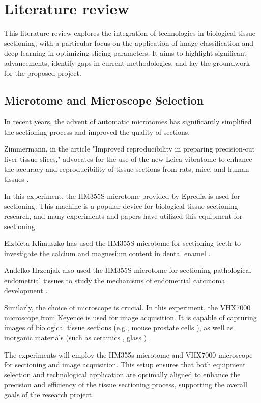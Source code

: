 \section{Literature review}

This literature review explores the integration of technologies in biological tissue sectioning, with a particular focus on the application of image classification and deep learning in optimizing slicing parameters. It aims to highlight significant advancements, identify gaps in current methodologies, and lay the groundwork for the proposed project.

\subsection{Microtome and Microscope Selection}

In recent years, the advent of automatic microtomes has significantly simplified the sectioning process and improved the quality of sections.

Zimmermann, in the article "Improved reproducibility in preparing precision-cut liver tissue slices," advocates for the use of the new Leica vibratome to enhance the accuracy and reproducibility of tissue sections from rats, mice, and human tissues \cite{LR.1}.

In this experiment, the HM355S microtome provided by Epredia is used for sectioning. This machine is a popular device for biological tissue sectioning research, and many experiments and papers have utilized this equipment for sectioning.

Elzbieta Klimuszko has used the HM355S microtome for sectioning teeth to investigate the calcium and magnesium content in dental enamel \cite{LR.2}.

Andelko Hrzenjak also used the HM355S microtome for sectioning pathological endometrial tissues to study the mechanisms of endometrial carcinoma development \cite{LR.3}.

Similarly, the choice of microscope is crucial. In this experiment, the VHX7000 microscope from Keyence is used for image acquisition. It is capable of capturing images of biological tissue sections (e.g., mouse prostate cells \cite{LR.4}),
as well as inorganic materials (such as ceramics \cite{LR.5}, glass \cite{LR.6}).

The experiments will employ the HM355s microtome and VHX7000 microscope for sectioning and image acquisition. This setup ensures that both equipment selection and technological application are optimally aligned to enhance the precision and efficiency of the tissue sectioning process, supporting the overall goals of the research project.

